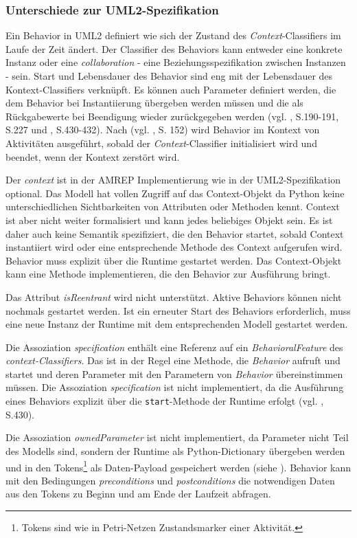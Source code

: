 \subsubsection{Unterschiede zur UML2-Spezifikation}
Ein Behavior in UML2 definiert wie sich der Zustand des \emph{Context}-Classifiers im Laufe der Zeit ändert. Der Classifier des Behaviors kann entweder eine konkrete Instanz oder eine \emph{collaboration} - eine Beziehungsspezifikation zwischen Instanzen - sein. Start und Lebensdauer des Behavior sind eng mit der Lebensdauer des Kontext-Classifiers verknüpft. Es können auch Parameter definiert werden, die dem Behavior bei Instantiierung übergeben werden müssen und die als Rückgabewerte bei Beendigung wieder zurückgegeben werden (vgl. \citep{RumbaughJacobsonBooch2005}, S.190-191, S.227 und \citep{OMG2009}, S.430-432). Nach (vgl. \citep{RumbaughJacobsonBooch2005}, S. 152) wird Behavior im Kontext von Aktivitäten ausgeführt, sobald der \emph{Context}-Classifier initialisiert wird und beendet, wenn der Kontext zerstört wird.

Der \emph{context} ist in der AMREP Implementierung wie in der UML2-Spezifikation  optional. Das Modell hat vollen Zugriff auf das Context-Objekt da Python keine unterschiedlichen Sichtbarkeiten von Attributen oder Methoden kennt. Context ist aber nicht weiter formalisiert und kann jedes beliebiges Objekt sein. Es ist daher auch keine Semantik spezifiziert, die den Behavior startet, sobald Context instantiiert wird oder eine entsprechende Methode des Context aufgerufen wird. Behavior muss explizit über die Runtime gestartet werden. Das Context-Objekt kann eine Methode implementieren, die den Behavior zur Ausführung bringt.

Das Attribut \emph{isReentrant} wird nicht unterstützt. Aktive Behaviors können nicht nochmals gestartet werden. Ist ein erneuter Start des Behaviors erforderlich, muss eine neue Instanz der Runtime mit dem entsprechenden Modell gestartet werden.

Die Assoziation \emph{specification} enthält eine Referenz auf ein \emph{BehavioralFeature} des \emph{context-Classifiers}. Das ist in der Regel eine Methode, die \emph{Behavior} aufruft und startet und deren Parameter mit den Parametern von \emph{Behavior} übereinstimmen müssen. Die Assoziation \emph{specification} ist nicht implementiert, da die Ausführung eines Behaviors explizit über die \texttt{start}-Methode der Runtime erfolgt (vgl. \citep{OMG2009}, S.430).

Die Assoziation \emph{ownedParameter} ist nicht implementiert, da Parameter nicht Teil des Modells sind, sondern der Runtime als Python-Dictionary übergeben werden und in den Tokens\footnote{Tokens sind wie in Petri-Netzen Zustandsmarker einer Aktivität.} als Daten-Payload gespeichert werden (siehe ). Behavior kann mit den Bedingungen \emph{preconditions} und \emph{postconditions} die notwendigen Daten aus den Tokens zu Beginn und am Ende der Laufzeit abfragen.

